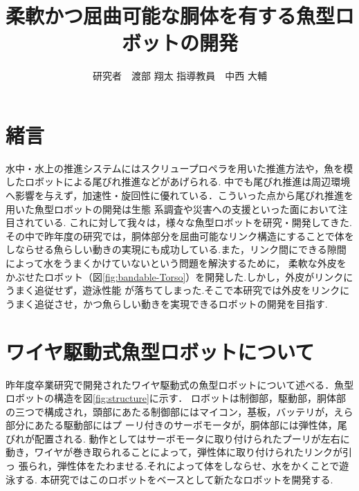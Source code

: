 \documentclass{jarticle}
\begin{document}

\title{
柔軟かつ屈曲可能な胴体を有する魚型ロボットの開発
}
\author{
研究者　渡部 翔太\;\;\;
指導教員　中西 大輔
}

\maketitle

\thispagestyle{empty}  %

\section{緒言}
水中・水上の推進システムにはスクリュープロペラを用いた推進方法や，魚を模したロボットによる尾びれ推進などがあげられる.
中でも尾びれ推進は周辺環境へ影響を与えず，加速性・旋回性に優れている．こういった点から尾びれ推進を用いた魚型ロボットの開発は生態
系調査や災害への支援といった面において注目されている\cite{ichi}.
これに対して我々は，様々な魚型ロボットを研究・開発してきた.その中で昨年度の研究では，胴体部分を屈曲可能なリンク構造にすることで体を
しならせる魚らしい動きの実現にも成功している.また，リンク間にできる隙間によって水をうまくかけていないという問題を解決するために，
柔軟な外皮をかぶせたロボット（図\ref{fig:bandable-Torso}）を開発した\cite{ni}.しかし，外皮がリンクにうまく追従せず，遊泳性能
が落ちてしまった.そこで本研究では外皮をリンクにうまく追従させ，かつ魚らしい動きを実現できるロボットの開発を目指す.


\section{ワイヤ駆動式魚型ロボットについて}
昨年度卒業研究で開発されたワイヤ駆動式の魚型ロボットについて述べる．魚型ロボットの構造を図\ref{fig:structure}に示す．
ロボットは制御部，駆動部，胴体部の三つで構成され，頭部にあたる制御部にはマイコン，基板，バッテリが，えら部分にあたる駆動部にはプ
ーリ付きのサーボモータが，胴体部には弾性体，尾びれが配置される.
動作としてはサーボモータに取り付けられたプーリが左右に動き，ワイヤが巻き取られることによって，弾性体に取り付けられたリンクが引っ
張られ，弾性体をたわませる.それによって体をしならせ、水をかくことで遊泳する.
本研究ではこのロボットをベースとして新たなロボットを開発する.
\end{document}
